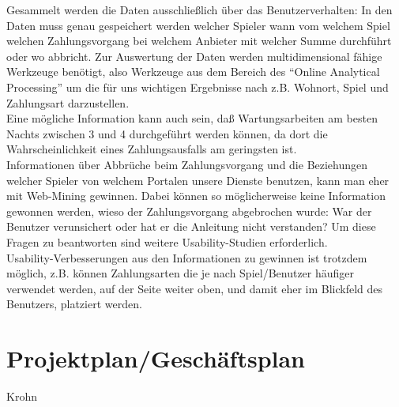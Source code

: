 \documentclass[a4paper,10pt]{article}
\begin{document}
Gesammelt werden die Daten ausschließlich über das Benutzerverhalten:
In den Daten muss genau gespeichert werden welcher Spieler wann vom welchem Spiel welchen Zahlungsvorgang bei welchem Anbieter mit welcher Summe durchführt oder wo abbricht.
Zur Auswertung der Daten werden multidimensional fähige Werkzeuge benötigt, also Werkzeuge aus dem Bereich des "`Online Analytical Processing"' um die für uns wichtigen Ergebnisse
nach z.B. Wohnort, Spiel und Zahlungsart darzustellen.\\
Eine mögliche Information kann auch sein, daß Wartungsarbeiten am besten Nachts zwischen 3 und 4 durchgeführt werden können, da dort die Wahrscheinlichkeit eines Zahlungsausfalls am geringsten ist.\\
Informationen über Abbrüche beim Zahlungsvorgang und die Beziehungen welcher Spieler von welchem Portalen unsere Dienste benutzen, kann man eher mit Web-Mining gewinnen.
Dabei können so möglicherweise keine Information gewonnen werden, wieso der Zahlungsvorgang abgebrochen wurde: War der Benutzer verunsichert oder hat er die Anleitung nicht verstanden?
Um diese Fragen zu beantworten sind weitere Usability-Studien erforderlich.\\
Usability-Verbesserungen aus den Informationen zu gewinnen ist trotzdem möglich, z.B. können Zahlungsarten die je nach Spiel/Benutzer häufiger verwendet werden, auf der Seite weiter oben, und damit eher im Blickfeld des Benutzers, platziert werden.

\section{Projektplan/Geschäftsplan}\label{labelGeschaeftsplan}
Krohn



\end{document}

